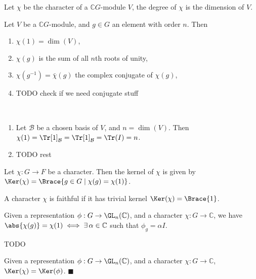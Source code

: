 \documentclass[../Project.tex]{subfiles}
\begin{document}
\begin{defi}
	Let $\chi$ be the character of a $\mathbb{C}G$-module $V$, the degree of $\chi$ is the dimension of $V$.
\end{defi}

\begin{prop}[\cite{1}]
	Let $V$ be a $\mathbb{C}G$-module, and $g \in G$ an element with order $n$. Then
	\begin{enumerate}
		\item $\chi(1) = \dim(V)$,
		\item $\chi(g)$ is the sum of all $n$th roots of unity,
		\item $\chi(g^{-1}) = \bar{\chi}(g)$ the complex conjugate of $\chi(g)$,
		\item TODO check if we need conjugate stuff
	\end{enumerate}
\end{prop}
\begin{proo*}[\cite {2}]~ %
	\vspace{-\topsep}
	\begin{enumerate}
	\item Let $\mathcal{B}$ be a chosen basis of $V$, and $n = \dim(V)$. Then $\chi(1) = \Tr[1]_\mathcal{B} = \Tr[1]_\mathcal{B} = \Tr(I) = n$.
	\item TODO rest
	\end{enumerate}
\end{proo*}

\begin{defi}
	Let $\chi : G \to F$ be a character. Then the kernel of $\chi$ is given by $\Ker(\chi) = \Brace{g \in G \;\vert\; \chi(g) = \chi(1)}$.
\end{defi}

\begin{defi}
	A character $\chi$ is faithful if it has trivial kernel $\Ker(\chi) = \Brace{1}$.
\end{defi}

\begin{theo}[\cite{2}]
	Given a representation $\phi : G \to \GL_n(\mathbb{C})$, and a character $\chi : G \to \mathbb{C}$, we have $\abs{\chi(g)} = \chi(1) \iff \exists \,\alpha \in \mathbb{C}$ such that $\phi_g = \alpha I$.
	\label{8}
\end{theo}
\begin{proo*}[\cite{2}]
TODO
\end{proo*}
\begin{theo}[\cite{2}]
	Given a representation $\phi : G \to \GL_n(\mathbb{C})$, and a character $\chi : G \to \mathbb{C}$, $\Ker(\chi) = \Ker(\phi)$. $\blacksquare$
\end{theo}
\end{document}
